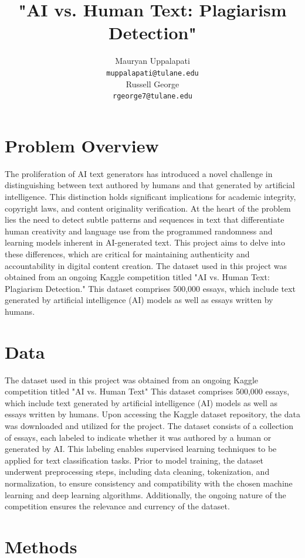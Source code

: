 \documentclass[11pt,a4paper]{article}
\title{"AI vs. Human Text: Plagiarism Detection"}
\author{
  Mauryan Uppalapati \\
  \texttt{muppalapati@tulane.edu} \\\And
  Russell George \\
  \texttt{rgeorge7@tulane.edu} \\
}
\date{}
\begin{document}
\maketitle



\section{Problem Overview}
The proliferation of AI text generators has introduced a novel challenge in distinguishing between text authored by humans and that generated by artificial intelligence. This distinction holds significant implications for academic integrity, copyright laws, and content originality verification. At the heart of the problem lies the need to detect subtle patterns and sequences in text that differentiate human creativity and language use from the programmed randomness and learning models inherent in AI-generated text. This project aims to delve into these differences, which are critical for maintaining authenticity and accountability in digital content creation. The dataset used in this project was obtained from an ongoing Kaggle competition titled "AI vs. Human Text: Plagiarism Detection." This dataset comprises 500,000 essays, which include text generated by artificial intelligence (AI) models as well as essays written by humans. 

\section{Data}

The dataset used in this project was obtained from an ongoing Kaggle competition titled "AI vs. Human Text" This dataset comprises 500,000 essays, which include text generated by artificial intelligence (AI) models as well as essays written by humans. Upon accessing the Kaggle dataset repository, the data was downloaded and utilized for the project. The dataset consists of a collection of essays, each labeled to indicate whether it was authored by a human or generated by AI. This labeling enables supervised learning techniques to be applied for text classification tasks. Prior to model training, the dataset underwent preprocessing steps, including data cleaning, tokenization, and normalization, to ensure consistency and compatibility with the chosen machine learning and deep learning algorithms. Additionally, the ongoing nature of the competition ensures the relevance and currency of the dataset.  

\section{Methods}
\end{document}

